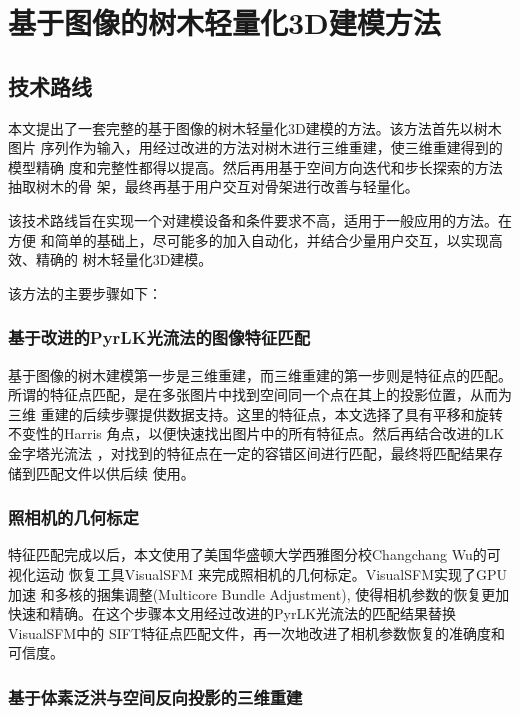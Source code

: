 
\chapter{基于图像的树木轻量化3D建模方法}
\label{cha:techroute}

\section{技术路线}
\label{sec:techroute}
本文提出了一套完整的基于图像的树木轻量化3D建模的方法。该方法首先以树木图片
序列作为输入，用经过改进的方法对树木进行三维重建，使三维重建得到的模型精确
度和完整性都得以提高。然后再用基于空间方向迭代和步长探索的方法抽取树木的骨
架，最终再基于用户交互对骨架进行改善与轻量化。

该技术路线旨在实现一个对建模设备和条件要求不高，适用于一般应用的方法。在方便
和简单的基础上，尽可能多的加入自动化，并结合少量用户交互，以实现高效、精确的
树木轻量化3D建模。

该方法的主要步骤如下：

\subsection{基于改进的PyrLK光流法的图像特征匹配}
\label{sec:match}
基于图像的树木建模第一步是三维重建，而三维重建的第一步则是特征点的匹配。
所谓的特征点匹配，是在多张图片中找到空间同一个点在其上的投影位置，从而为三维
重建的后续步骤提供数据支持。这里的特征点，本文选择了具有平移和旋转不变性的Harris\cite{harris}
角点，以便快速找出图片中的所有特征点。然后再结合改进的LK金字塔光流法\cite{Lucas81aniterative}
，对找到的特征点在一定的容错区间进行匹配，最终将匹配结果存储到匹配文件以供后续
使用。

\subsection{照相机的几何标定}
\label{sec:calibration}
特征匹配完成以后，本文使用了美国华盛顿大学西雅图分校Changchang Wu的可视化运动
恢复工具VisualSFM\cite{vsfm} 来完成照相机的几何标定。VisualSFM实现了GPU加速\cite{siftgpu}
和多核的捆集调整(Multicore Bundle Adjustment)\cite{mba}, 使得相机参数的恢复更加
快速和精确。在这个步骤本文用经过改进的PyrLK光流法的匹配结果替换VisualSFM中的
SIFT特征点匹配文件，再一次地改进了相机参数恢复的准确度和可信度。

\subsection{基于体素泛洪与空间反向投影的三维重建}
\label{sec:3drec}

